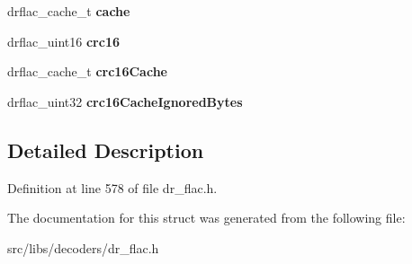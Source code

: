 \begin{DoxyCompactItemize}
\item 
\hypertarget{structdrflac__bs_adfc58bf7ae778f4c96bac0a620aeb3b5}{drflac\-\_\-cache\-\_\-t {\bfseries cache}}\label{structdrflac__bs_adfc58bf7ae778f4c96bac0a620aeb3b5}

\item 
\hypertarget{structdrflac__bs_a48c014d8128684f79c5cf829d89ebf13}{drflac\-\_\-uint16 {\bfseries crc16}}\label{structdrflac__bs_a48c014d8128684f79c5cf829d89ebf13}

\item 
\hypertarget{structdrflac__bs_ad0e9287499d5286b5d9e18c53d1fcf71}{drflac\-\_\-cache\-\_\-t {\bfseries crc16\-Cache}}\label{structdrflac__bs_ad0e9287499d5286b5d9e18c53d1fcf71}

\item 
\hypertarget{structdrflac__bs_a107f30d9f7fdb9a81054011a5c77d4b3}{drflac\-\_\-uint32 {\bfseries crc16\-Cache\-Ignored\-Bytes}}\label{structdrflac__bs_a107f30d9f7fdb9a81054011a5c77d4b3}

\end{DoxyCompactItemize}


\subsection{Detailed Description}


Definition at line 578 of file dr\-\_\-flac.\-h.



The documentation for this struct was generated from the following file\-:\begin{DoxyCompactItemize}
\item 
src/libs/decoders/dr\-\_\-flac.\-h\end{DoxyCompactItemize}
